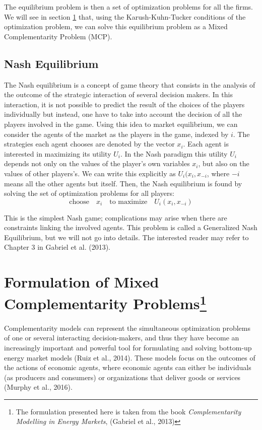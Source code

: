 \documentclass[11pt, letterpaper]{article}
\begin{document}
The equilibrium problem is then a set of optimization problems for all the firms. We will see in section \ref{MCP} that, using the Karush-Kuhn-Tucker conditions of the optimization problem, we can solve this equilibrium problem as a Mixed Complementarity Problem (MCP). 

\subsection{Nash Equilibrium}


The Nash equilibrium is a concept of game theory that consists in the analysis of the outcome of the strategic interaction of several decision makers. In this interaction, it is not possible to predict the result of the choices of the players individually but instead, one have to take into account the decision of all the players involved in the game. 
Using this idea to market equilibrium, we can consider the agents of the market as the players in the game, indexed by $i$. The strategies each agent chooses are denoted by the vector $x_i$. Each agent is interested in maximizing its utility $U_i$. In the Nash paradigm this utility $U_i$ depends not only on the values of the player’s own variables $x_i$, but also on the values of other players's. We can write this explicitly as $U_i(x_i,x_{-i}$, where $-i$ means all the other agents but itself. Then, the Nash equilibrium is found by solving the set of optimization problems for all players:
\begin{equation}
    \textrm{choose} \quad x_i \quad \textrm{to maximize} \quad U_i(x_i,x_{-i})
\end{equation}

This is the simplest Nash game; complications may arise when there are constraints linking the involved agents. This problem is called a Generalized Nash Equilibrium, but we will not go into details. The interested reader may refer to Chapter 3 in Gabriel et al. (2013). 

\section{Formulation of Mixed Complementarity Problems\footnote{The formulation presented here is taken from the book \textit{Complementarity Modelling in Energy Markets}, (Gabriel et al., 2013) } } \label{MCP}

Complementarity models can represent the simultaneous optimization
problems of one or several interacting decision-makers, and thus they have become an increasingly important and powerful tool for formulating and solving bottom-up energy market models (Ruiz et al., 2014). These models focus on the outcomes of the actions of economic agents, where economic agents can either be individuals (as producers and consumers) or organizations that deliver goods or services (Murphy et al., 2016).
\end{document}
